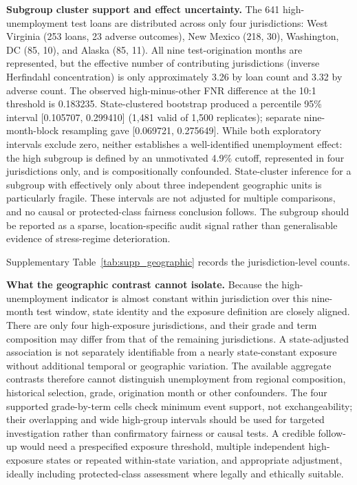 \documentclass[10pt]{article}
\begin{document}
\noindent\textbf{Subgroup cluster support and effect uncertainty.} The 641 high-unemployment test loans are distributed across only four jurisdictions: West Virginia (253 loans, 23 adverse outcomes), New Mexico (218, 30), Washington, DC (85, 10), and Alaska (85, 11). All nine test-origination months are represented, but the effective number of contributing jurisdictions (inverse Herfindahl concentration) is only approximately 3.26 by loan count and 3.32 by adverse count. The observed high-minus-other FNR difference at the 10:1 threshold is 0.183235. State-clustered bootstrap produced a percentile 95\% interval [0.105707, 0.299410] (1,481 valid of 1,500 replicates); separate nine-month-block resampling gave [0.069721, 0.275649]. While both exploratory intervals exclude zero, neither establishes a well-identified unemployment effect: the high subgroup is defined by an unmotivated 4.9\% cutoff, represented in four jurisdictions only, and is compositionally confounded. State-cluster inference for a subgroup with effectively only about three independent geographic units is particularly fragile. These intervals are not adjusted for multiple comparisons, and no causal or protected-class fairness conclusion follows. The subgroup should be reported as a sparse, location-specific audit signal rather than generalisable evidence of stress-regime deterioration.

Supplementary Table~\ref{tab:supp_geographic} records the jurisdiction-level counts.


\noindent\textbf{What the geographic contrast cannot isolate.} Because the high-unemployment indicator is almost constant within jurisdiction over this nine-month test window, state identity and the exposure definition are closely aligned. There are only four high-exposure jurisdictions, and their grade and term composition may differ from that of the remaining jurisdictions. A state-adjusted association is not separately identifiable from a nearly state-constant exposure without additional temporal or geographic variation. The available aggregate contrasts therefore cannot distinguish unemployment from regional composition, historical selection, grade, origination month or other confounders. The four supported grade-by-term cells check minimum event support, not exchangeability; their overlapping and wide high-group intervals should be used for targeted investigation rather than confirmatory fairness or causal tests. A credible follow-up would need a prespecified exposure threshold, multiple independent high-exposure states or repeated within-state variation, and appropriate adjustment, ideally including protected-class assessment where legally and ethically suitable.
\end{document}
